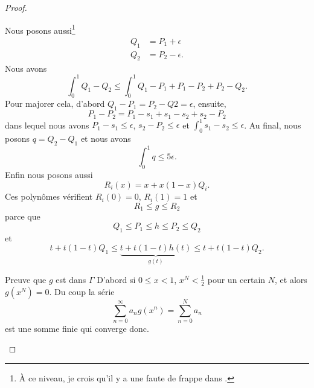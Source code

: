 \begin{proof}
\begin{subproof}
		Nous posons aussi\footnote{À ce niveau, je crois qu'il y a une faute de frappe dans \cite{ytMOpe}.}
		\begin{subequations}
			\begin{align}
				Q_1 & =P_1+\epsilon  \\
				Q_2 & =P_2-\epsilon.
			\end{align}
		\end{subequations}
		Nous avons
		\begin{equation}
			\int_0^1Q_1-Q_2\leq\int_0^1 Q_1-P_1+P_1-P_2+P_2-Q_2.
		\end{equation}
		Pour majorer cela, d'abord \( Q_1-P_1=P_2-Q2=\epsilon\), ensuite,
		\begin{equation}
			P_1-P_2=P_1-s_1+s_1-s_2+s_2-P_2
		\end{equation}
		dans lequel nous avons \( P_1-s_1\leq \epsilon\), \( s_2-P_2\leq \epsilon\) et \( \int_0^1s_1-s_2\leq\epsilon\). Au final, nous posons \( q=Q_2-Q_1\) et nous avons
		\begin{equation}
			\int_0^1q\leq 5\epsilon.
		\end{equation}
		Enfin nous posons aussi
		\begin{equation}
			R_i(x)=x+x(1-x)Q_i.
		\end{equation}
		Ces polynômes vérifient \( R_i(0)=0\), \( R_i(1)=1\) et
		\begin{equation}
			R_1\leq g\leq R_2
		\end{equation}
		parce que
		\begin{equation}
			Q_1\leq P_1\leq h\leq  P_2\leq Q_2
		\end{equation}
		et
		\begin{equation}
			t+t(1-t)Q_1\leq \underbrace{t+t(1-t)h(t)}_{g(t)}\leq t+t(1-t)Q_2.
		\end{equation}

		\item[Preuve que \( g\) est dans \( \Gamma\)]
		D'abord si \( 0\leq x<1\), \( x^N<\frac{ 1 }{2}\) pour un certain \( N\), et alors \( g(x^N)=0\). Du coup la série
		\begin{equation}
			\sum_{n=0}^{\infty}a_ng(x^n)=\sum_{n=0}^{N}a_n
		\end{equation}
		est une somme finie qui converge donc.


\end{subproof}
\end{proof}
